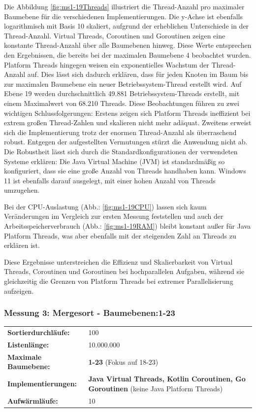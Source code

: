 \documentclass[fontsize=12pt,paper=a4,twoside=semi,parskip=half-,headsepline,headinclude]{scrreprt}
\begin{document}
Die Abbildung \ref{fig:ms1-19Threads} illustriert die Thread-Anzahl pro maximaler Baumebene für die verschiedenen Implementierungen. Die y-Achse ist ebenfalls logarithmisch mit Basis 10 skaliert, aufgrund der erheblichen Unterschiede in der Thread-Anzahl. Virtual Threads, Coroutinen und Goroutinen zeigen eine konstante Thread-Anzahl über alle Baumebenen hinweg. Diese Werte entsprechen den Ergebnissen, die bereits bei der maximalen Baumebene 4 beobachtet wurden. Platform Threads hingegen weisen ein exponentielles Wachstum der Thread-Anzahl auf. Dies lässt sich dadurch erklären, dass für jeden Knoten im Baum bis zur maximalen Baumebene ein neuer Betriebssystem-Thread erstellt wird. Auf Ebene 19 werden durchschnittlich 49.881 Betriebssystem-Threads erstellt, mit einem Maximalwert von 68.210 Threads. Diese Beobachtungen führen zu zwei wichtigen Schlussfolgerungen: Erstens zeigen sich Platform Threads ineffizient bei extrem großen Thread-Zahlen und skalieren nicht mehr adäquat. Zweitens erweist sich die Implementierung trotz der enormen Thread-Anzahl als überraschend robust. Entgegen der aufgestellten Vermutungen stürzt die Anwendung nicht ab. Die Robustheit lässt sich durch die Standardkonfigurationen der verwendeten Systeme erklären: Die Java Virtual Machine (JVM) ist standardmäßig so konfiguriert, dass sie eine große Anzahl von Threads handhaben kann. Windows 11 ist ebenfalls darauf ausgelegt, mit einer hohen Anzahl von Threads umzugehen. 

Bei der CPU-Auslastung (Abb.: \ref{fig:ms1-19CPU}) lassen sich kaum Veränderungen im Vergleich zur ersten Messung feststellen und auch der Arbeitsspeicherverbrauch (Abb.: \ref{fig:ms1-19RAM}) bleibt konstant außer für Java Platform Threads, was aber ebenfalls mit der steigenden Zahl an Threads zu erklären ist.

Diese Ergebnisse unterstreichen die Effizienz und Skalierbarkeit von Virtual Threads, Coroutinen und Goroutinen bei hochparallelen Aufgaben, während sie gleichzeitig die Grenzen von Platform Threads bei extremer Parallelisierung aufzeigen.

\subsubsection{Messung 3: Mergesort - Baumebenen:1-23}

\begin{tabularx}{\textwidth}{@{}lX@{}}
	\textbf{Sortierdurchläufe:} & 100 \\
	\textbf{Listenlänge:} & 10.000.000 \\
	\textbf{Maximale Baumebene:} & \textbf{1-23} (Fokus auf 18-23) \\
	\textbf{Implementierungen:} & \textbf{Java Virtual Threads, Kotlin Coroutinen, Go Goroutinen} (keine Java Platform Threads) \\
	\textbf{Aufwärmläufe:} & 10
\end{tabularx}
\end{document}
